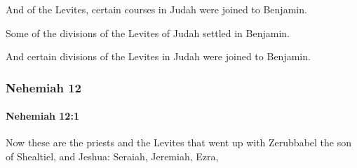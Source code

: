			\begin{versebox}
					\item[BHS] 
					\item[LXX] 
					\item[ASV] And of the Levites, certain courses in Judah were joined to Benjamin.
					\item[NIV] Some of the divisions of the Levites of Judah settled in Benjamin.
					\item[NRSV] And certain divisions of the Levites in Judah were joined to Benjamin.
			\end{versebox}
	\subsubsection{Nehemiah 12} %
		\label{NEHEMIAH-12}

		\paragraph{Nehemiah 12:1} %
			\label{NEHEMIAH-12-1}

			Now these are the priests and the Levites that went up with Zerubbabel the son of Shealtiel, and Jeshua: Seraiah, Jeremiah, Ezra,


